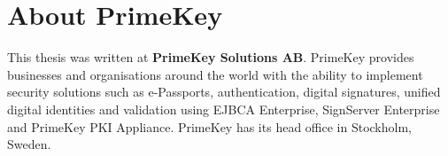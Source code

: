 \ifbook
\clearpage
\fi
\section*{About PrimeKey}
This thesis was written at \textbf{PrimeKey Solutions AB}. PrimeKey provides businesses and organisations around the world with the ability to implement security solutions such as e-Passports, authentication, digital signatures, unified digital identities and validation using EJBCA Enterprise, SignServer Enterprise and PrimeKey PKI Appliance. PrimeKey has its head office in Stockholm, Sweden.